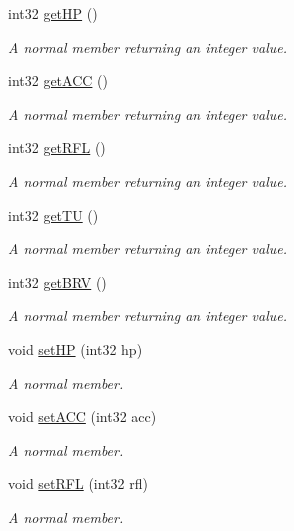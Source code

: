 \begin{DoxyCompactItemize}
int32 \hyperlink{class_a_unit2_d_a5f1d562d11394d02ad291e7cdfaa159b}{get\+HP} ()
\begin{DoxyCompactList}\small\item\em A normal member returning an integer value. \end{DoxyCompactList}\item 
int32 \hyperlink{class_a_unit2_d_a0e21fbf4b83553f9910b4dd9a28ba2fb}{get\+A\+CC} ()
\begin{DoxyCompactList}\small\item\em A normal member returning an integer value. \end{DoxyCompactList}\item 
int32 \hyperlink{class_a_unit2_d_aa66921015cf3b796869bd23fddcc162b}{get\+R\+FL} ()
\begin{DoxyCompactList}\small\item\em A normal member returning an integer value. \end{DoxyCompactList}\item 
int32 \hyperlink{class_a_unit2_d_adbe5785b68849e82ab11c48f86df64e7}{get\+TU} ()
\begin{DoxyCompactList}\small\item\em A normal member returning an integer value. \end{DoxyCompactList}\item 
int32 \hyperlink{class_a_unit2_d_a484b69b741bb37babd27306fbfc5990b}{get\+B\+RV} ()
\begin{DoxyCompactList}\small\item\em A normal member returning an integer value. \end{DoxyCompactList}\item 
void \hyperlink{class_a_unit2_d_a60a8c2a02713d1fb838757a2b74c0d5b}{set\+HP} (int32 hp)
\begin{DoxyCompactList}\small\item\em A normal member. \end{DoxyCompactList}\item 
void \hyperlink{class_a_unit2_d_a6c9367b81fabd482ded876c47e006d35}{set\+A\+CC} (int32 acc)
\begin{DoxyCompactList}\small\item\em A normal member. \end{DoxyCompactList}\item 
void \hyperlink{class_a_unit2_d_a1f444ba247643672bec2a87beec14fb0}{set\+R\+FL} (int32 rfl)
\begin{DoxyCompactList}\small\item\em A normal member. \end{DoxyCompactList}\item 

\end{DoxyCompactItemize}
